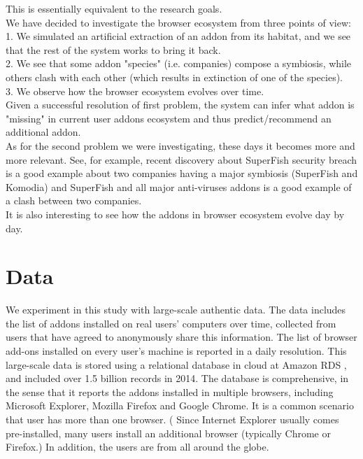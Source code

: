 \documentclass[11pt,oneside]{book}
\let\Oldsection\section
\renewcommand{\section}{\FloatBarrier\Oldsection}
\begin{document}
This is essentially equivalent to the research goals.\\
We have decided to investigate the browser ecosystem from three points of view:\\
1. We simulated an artificial extraction of an addon from its habitat, and we see that the rest of the system works to bring it back.\\
2. We see that some addon "species" (i.e. companies) compose a symbiosis, while others clash with each other (which results in extinction of one of the species).\\
3. We observe how the browser ecosystem evolves over time.\\
Given a successful resolution of first problem, the system can infer what addon is "missing" in current user addons ecosystem and thus predict/recommend an additional addon.\\
As for the second problem we were investigating, these days it becomes more and more relevant. See, for example, recent discovery about SuperFish security breach is a good example about two companies having a major symbiosis (SuperFish and Komodia) and SuperFish and all major anti-viruses addons is a good example of a clash between two companies.\\
It is also interesting to see how the addons in browser ecosystem evolve day by day.



\chapter{Data}
\label{sec:datasets}

We experiment in this study with large-scale authentic data.  The data includes the list of addons installed on real users' computers over time, collected from users that have agreed to anonymously share this information.  The list of browser add-ons installed on every user's machine is reported in a daily resolution.  This large-scale data is stored using a relational database in cloud at Amazon RDS , and included over 1.5 billion records in 2014. The database is comprehensive, in the sense that it  reports the addons installed in multiple browsers, including Microsoft Explorer, Mozilla Firefox and Google Chrome. It  is a common scenario that user has more than one browser. ( Since Internet Explorer usually comes pre-installed, many users install an additional browser (typically Chrome or Firefox.) In addition, the users are from all around the globe. 
\end{document}
